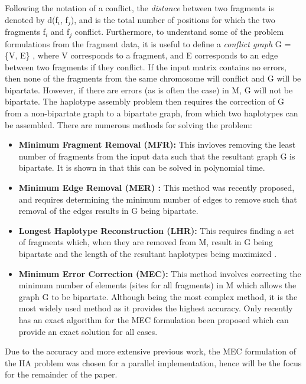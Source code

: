 \documentclass[10pt,twocolumn]{article}
\begin{document}
Following the notation of a conflict, the \textit{distance} between two fragments is
denoted by d(f$_i$, f$_j$), and is the total number of positions for which the two fragments f$_i$ and f$_j$
conflict. Furthermore, to understand some of the problem formulations from the fragment data, it is useful to
define a \textit{conflict graph} G = \{V, E\} \cite{lancia:2001}, where V corresponds to a fragment, and E
corresponds to an edge between two fragments if they conflict. If the input matrix contains no errors, then none
of the fragments from the same chromosome will conflict and G will be bipartate. However, if there are 
errors (as is often the case) in M, G will not be bipartate. The haplotype assembly problem then requires 
the correction of G from a non-bipartate graph to a bipartate graph, from which two haplotypes can be
assembled. There are numerous methods for solving the problem:
\begin{itemize}[noitemsep]
    \item{ \textbf{Minimum Fragment Removal (MFR):} This invloves removing the least number of fragments 
            from the input data such that the resultant graph G is bipartate. It is shown in 
            \cite{lancia:2001} that this can be solved in polynomial time.
        }
\item{ \textbf{Minimum Edge Removal (MER) \cite{aguiar:2012}:} This method was recently proposed, and requires
        determining the minimum number of edges to remove such that removal of the edges results in G being 
        bipartate.
    }
\item{ \textbf{Longest Haplotype Reconstruction (LHR):} This requires finding a set of fragments which,
        when they are removed from M, result in G being bipartate and the length of the resultant 
        haplotypes being maximized \cite{schwartz:2010}. 
    }
\item{ \textbf{Minimum Error Correction (MEC):} This method involves correcting the minimum number of 
        elements (sites for all fragments) in M which allows the graph G to be bipartate. 
        Although being the most complex method, it is the most widely used method as it provides the 
        highest accuracy. Only recently has an exact algorithm for the MEC formulation been proposed which 
        can provide an exact solution for all cases.
    }
\end{itemize}
Due to the accuracy and more extensive previous work, the MEC formulation of the HA problem was chosen for a
parallel implementation, hence will be the focus for the remainder of the paper.
\end{document}
